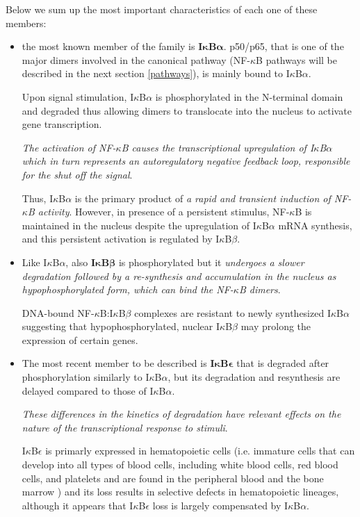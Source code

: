 \documentclass[12pt,a4paper]{report}
\begin{document}
Below we sum up the most important characteristics of each one of these members:
\begin{itemize}
 \item the most known member of the family is \textbf{I$\bm{\kappa}$B$\bm{\alpha}$}. p50/p65, that is one of the major dimers involved in the canonical pathway (NF-$\kappa$B pathways will be described in the next section \ref{pathways}), is mainly bound to I$\kappa$B$\alpha$.
 
 Upon signal stimulation, I$\kappa$B$\alpha$ is phosphorylated in the N-terminal domain and degraded thus allowing dimers to translocate into the nucleus to activate gene transcription.
 
 \emph{The activation of NF-$\kappa$B causes the transcriptional upregulation of I$\kappa$B$\alpha$ which in turn represents an autoregulatory negative feedback loop, responsible for the shut off the signal}.
 
 Thus, I$\kappa$B$\alpha$ is the primary product of \emph{a rapid and transient induction of NF-$\kappa$B activity}. However, in presence of a persistent stimulus, NF-$\kappa$B is maintained in the nucleus despite the upregulation of I$\kappa$B$\alpha$ mRNA synthesis, and this persistent activation is regulated by I$\kappa$B$\beta$.
 
 
 \item Like I$\kappa$B$\alpha$, also \textbf{I$\bm{\kappa}$B$\bm{\beta}$} is phosphorylated but it \emph{undergoes a slower degradation followed by a re-synthesis and accumulation in the nucleus as hypophosphorylated form, which can bind the NF-$\kappa$B dimers}. 
 
 DNA-bound NF-$\kappa$B:I$\kappa$B$\beta$ complexes are resistant to newly synthesized
 I$\kappa$B$\alpha$ suggesting that hypophosphorylated, nuclear I$\kappa$B$\beta$ may prolong the expression of certain genes.
 
 \item The most recent member to be described is \textbf{I$\bm{\kappa}$B$\bm{\epsilon}$} that is degraded after phosphorylation similarly to I$\kappa$B$\alpha$, but its degradation and resynthesis are delayed compared to those of I$\kappa$B$\alpha$.

 \emph{These differences in the kinetics of degradation have relevant effects on the
 nature of the transcriptional response to stimuli}.
 
 I$\kappa$B$\epsilon$ is primarly expressed in hematopoietic cells (i.e. immature cells that can develop into all types of blood cells, including white blood cells, red blood cells, and platelets and are found in the peripheral blood and the bone marrow \cite{hematopoieticNIH}) and its loss results in selective defects in hematopoietic lineages, although it appears that I$\kappa$B$\epsilon$ loss is largely compensated by I$\kappa$B$\alpha$.
 

\end{itemize}
\end{document}
